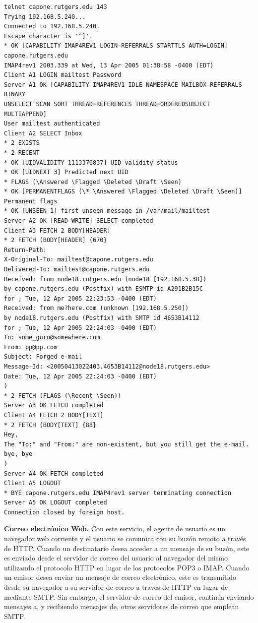 \documentclass[a4paper,11pt]{article}
\begin{document}
\begin{verbatim}
telnet capone.rutgers.edu 143
Trying 192.168.5.240...
Connected to 192.168.5.240.
Escape character is '^]'.
* OK [CAPABILITY IMAP4REV1 LOGIN-REFERRALS STARTTLS AUTH=LOGIN] capone.rutgers.edu
IMAP4rev1 2003.339 at Wed, 13 Apr 2005 01:38:58 -0400 (EDT)
Client A1 LOGIN mailtest Password
Server A1 OK [CAPABILITY IMAP4REV1 IDLE NAMESPACE MAILBOX-REFERRALS BINARY
UNSELECT SCAN SORT THREAD=REFERENCES THREAD=ORDEREDSUBJECT MULTIAPPEND]
User mailtest authenticated
Client A2 SELECT Inbox
* 2 EXISTS
* 2 RECENT
* OK [UIDVALIDITY 1113370837] UID validity status
* OK [UIDNEXT 3] Predicted next UID
* FLAGS (\Answered \Flagged \Deleted \Draft \Seen)
* OK [PERMANENTFLAGS (\* \Answered \Flagged \Deleted \Draft \Seen)]
Permanent flags
* OK [UNSEEN 1] first unseen message in /var/mail/mailtest
Server A2 OK [READ-WRITE] SELECT completed
Client A3 FETCH 2 BODY[HEADER]
* 2 FETCH (BODY[HEADER] {670}
Return-Path:
X-Original-To: mailtest@capone.rutgers.edu
Delivered-To: mailtest@capone.rutgers.edu
Received: from node18.rutgers.edu (node18 [192.168.5.38])
by capone.rutgers.edu (Postfix) with ESMTP id A291B2B15C
for ; Tue, 12 Apr 2005 22:23:53 -0400 (EDT)
Received: from me?here.com (unknown [192.168.5.250])
by node18.rutgers.edu (Postfix) with SMTP id 4653B14112
for ; Tue, 12 Apr 2005 22:24:03 -0400 (EDT)
To: some_guru@somewhere.com
From: pp@pp.com
Subject: Forged e-mail
Message-Id: <20050413022403.4653B14112@node18.rutgers.edu>
Date: Tue, 12 Apr 2005 22:24:03 -0400 (EDT)
)
* 2 FETCH (FLAGS (\Recent \Seen))
Server A3 OK FETCH completed
Client A4 FETCH 2 BODY[TEXT]
* 2 FETCH (BODY[TEXT] {88}
Hey,
The "To:" and "From:" are non-existent, but you still get the e-mail.
bye, bye
)
Server A4 OK FETCH completed
Client A5 LOGOUT
* BYE capone.rutgers.edu IMAP4rev1 server terminating connection
Server A5 OK LOGOUT completed
Connection closed by foreign host.
\end{verbatim}

\textbf{Correo electrónico Web.} Con este servicio, el agente de usuario es un navegador web corriente y el usuario se comunica con su buzón remoto a través de HTTP. Cuando un destinatario desea acceder a un mensaje de su buzón, este es enviado desde el servidor de correo del usuario al navegador del mismo utilizando el protocolo HTTP en lugar de los protocolos POP3 o IMAP. Cuando un emisor desea enviar un mensaje de correo electrónico, este es transmitido desde su navegador a su servidor de correo a través de HTTP en lugar de mediante SMTP. Sin embargo, el servidor de correo del emisor, continúa enviando mensajes a, y recibiendo mensajes de, otros servidores de correo que emplean SMTP. \\
\end{document}
